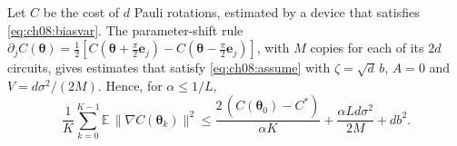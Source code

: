 \documentclass[handoutsbeamer.tex]{subfiles}
\begin{document}
\begin{frame}
\onp{\footnotesize}
\begin{cor}\label{cor:ch08:psr}
Let $C$ be the cost of $d$ Pauli rotations, estimated by a device that satisfies \eqref{eq:ch08:biasvar}. The parameter-shift rule $\partial_jC(\boldsymbol\theta) = \frac12[C(\boldsymbol\theta+\frac\pi2\boldsymbol e_j)-C(\boldsymbol\theta-\frac\pi2\boldsymbol e_j)]$, with $M$ copies for each of its $2d$ circuits, gives estimates that satisfy \eqref{eq:ch08:assume} with $\zeta = \sqrt d\,b$, $A = 0$ and $V = d\sigma^2/(2M)$. Hence, for $\alpha\le1/L$,
\begin{equation}\label{eq:ch08:psrbound}
    \frac1K\sum_{k=0}^{K-1}\mathbb E\,\|\nabla C(\boldsymbol\theta_k)\|^2\le\frac{2\,(C(\boldsymbol\theta_0)-C^*)}{\alpha K}+\frac{\alpha Ld\sigma^2}{2M}+db^2.
\end{equation}
\end{cor}


\end{frame}
\end{document}
